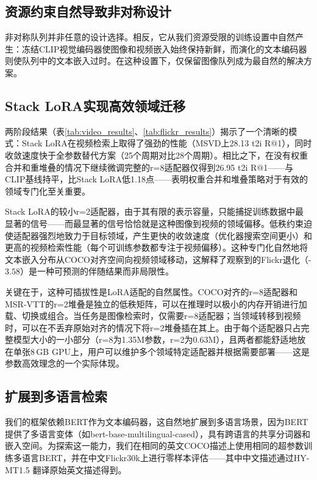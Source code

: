 \documentclass[10pt,a4paper]{ctexart}
\begin{document}
\subsection{资源约束自然导致非对称设计}

非对称队列并非任意的设计选择。相反，它从我们资源受限的训练设置中自然产生：冻结CLIP视觉编码器使图像和视频嵌入始终保持新鲜，而演化的文本编码器则使队列中的文本嵌入过时。在这种设置下，仅保留图像队列成为最自然的解决方案。

\subsection{Stack LoRA实现高效领域迁移}

两阶段结果（表\ref{tab:video_results}、\ref{tab:flickr_results}）揭示了一个清晰的模式：Stack LoRA在视频检索上取得了强劲的性能（MSVD上28.13 t2i R@1），同时收敛速度快于全参数替代方案（25个周期对比28个周期）。相比之下，在没有权重合并和重堆叠的情况下继续微调完整的r=8适配器仅得到26.95 t2i R@1——与CLIP基线持平，比Stack LoRA低1.18点——表明权重合并和堆叠策略对于有效的领域专门化至关重要。

Stack LoRA的较小r=2适配器，由于其有限的表示容量，只能捕捉训练数据中最显著的信号——而最显著的信号恰恰就是这种图像到视频的领域偏移。低秩约束迫使适配器强烈地致力于目标领域，产生更快的收敛速度（优化器搜索空间更小）和更高的视频检索性能（每个可训练参数都专注于视频偏移）。这种专门化自然地将文本嵌入分布从COCO对齐空间向视频领域移动，这解释了观察到的Flickr退化（-$3.58$）是一种可预测的伴随结果而非局限性。

关键在于，这种可插拔性是LoRA适配的自然属性。COCO对齐的r=8适配器和MSR-VTT的r=2堆叠是独立的低秩矩阵，可以在推理时以极小的内存开销进行加载、切换或组合。当任务是图像检索时，仅需要r=8适配器；当领域转移到视频时，可以在不丢弃原始对齐的情况下将r=2堆叠插在其上。由于每个适配器只占完整模型大小的一小部分（r=8为1.35M参数，r=2为0.63M），且两者都能舒适地放在单张8\,GB GPU上，用户可以维护多个领域特定适配器并根据需要部署——这是参数高效理念的一个实际体现。

\subsection{扩展到多语言检索}

我们的框架依赖BERT作为文本编码器，这自然地扩展到多语言场景，因为BERT提供了多语言变体（如bert-base-multilingual-cased），具有跨语言的共享分词器和嵌入空间。为探索这一能力，我们在相同的英文COCO描述上使用相同的超参数训练多语言BERT，并在中文Flickr30k上进行零样本评估——其中中文描述通过HY-MT1.5 \citep{hymt152025tencent}翻译原始英文描述得到。
\end{document}
